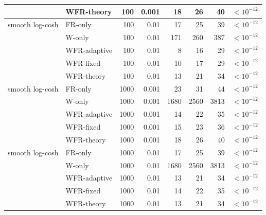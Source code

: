 \begin{tabular}{llrrrrrr}
 & WFR-theory & 100 & 0.001 & 18 & 26 & 40 & $<\!10^{-12}$ \\
\midrule
smooth log-cosh & FR-only & 100 & 0.01 & 17 & 25 & 39 & $<\!10^{-12}$ \\
 & W-only & 100 & 0.01 & 171 & 260 & 387 & $<\!10^{-12}$ \\
 & WFR-adaptive & 100 & 0.01 & 8 & 16 & 29 & $<\!10^{-12}$ \\
 & WFR-fixed & 100 & 0.01 & 10 & 17 & 29 & $<\!10^{-12}$ \\
 & WFR-theory & 100 & 0.01 & 13 & 21 & 34 & $<\!10^{-12}$ \\
\midrule
smooth log-cosh & FR-only & 1000 & 0.001 & 23 & 31 & 44 & $<\!10^{-12}$ \\
 & W-only & 1000 & 0.001 & 1680 & 2560 & 3813 & $<\!10^{-12}$ \\
 & WFR-adaptive & 1000 & 0.001 & 14 & 22 & 35 & $<\!10^{-12}$ \\
 & WFR-fixed & 1000 & 0.001 & 15 & 23 & 36 & $<\!10^{-12}$ \\
 & WFR-theory & 1000 & 0.001 & 18 & 26 & 40 & $<\!10^{-12}$ \\
\midrule
smooth log-cosh & FR-only & 1000 & 0.01 & 17 & 25 & 39 & $<\!10^{-12}$ \\
 & W-only & 1000 & 0.01 & 1680 & 2560 & 3813 & $<\!10^{-12}$ \\
 & WFR-adaptive & 1000 & 0.01 & 13 & 21 & 34 & $<\!10^{-12}$ \\
 & WFR-fixed & 1000 & 0.01 & 14 & 22 & 35 & $<\!10^{-12}$ \\
 & WFR-theory & 1000 & 0.01 & 13 & 21 & 34 & $<\!10^{-12}$ \\
\bottomrule
\end{tabular}
